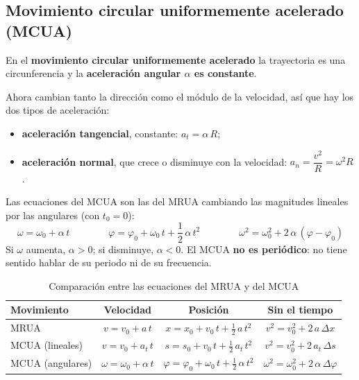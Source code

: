 \subsection{Movimiento circular uniformemente acelerado (MCUA)}

\begin{definition}[MCUA]
    En el \textbf{movimiento circular uniformemente acelerado} la trayectoria es una circunferencia y la \textbf{aceleración angular
    \(\alpha\) es constante}.
\end{definition}

Ahora cambian tanto la dirección como el módulo de la velocidad, así que hay los dos tipos de aceleración:
\begin{itemize}
    \item \textbf{aceleración tangencial}, constante: \(a_t = \alpha\,R\);
    \item \textbf{aceleración normal}, que crece o disminuye con la velocidad: \(a_n = \dfrac{v^2}{R} = \omega^2 R\).
\end{itemize}
Las ecuaciones del MCUA son las del MRUA cambiando las magnitudes lineales por las angulares (con \(t_0 = 0\)):
\[ \boxed{\omega = \omega_0 + \alpha\,t} \qquad\qquad \boxed{\varphi = \varphi_0 + \omega_0\,t + \frac{1}{2}\,\alpha\,t^2}
   \qquad\qquad \omega^2 = \omega_0^2 + 2\,\alpha\,(\varphi - \varphi_0) \]
Si \(\omega\) aumenta, \(\alpha > 0\); si disminuye, \(\alpha < 0\). El MCUA \textbf{no es periódico}: no tiene sentido hablar de su
periodo ni de su frecuencia.

\begin{table}[H]
    \centering
    \caption{Comparación entre las ecuaciones del MRUA y del MCUA}
    \vspace{-5pt}
    \begin{tabular}{@{}lccc@{}}
        \toprule
        \textbf{Movimiento} & \textbf{Velocidad} & \textbf{Posición} & \textbf{Sin el tiempo} \\
        \midrule
        MRUA & \(v = v_0 + a\,t\) & \(x = x_0 + v_0\,t + \frac{1}{2}\,a\,t^2\) & \(v^2 = v_0^2 + 2\,a\,\Delta x\) \\[3pt]
        MCUA (lineales) & \(v = v_0 + a_t\,t\) & \(s = s_0 + v_0\,t + \frac{1}{2}\,a_t\,t^2\) & \(v^2 = v_0^2 + 2\,a_t\,\Delta s\) \\[3pt]
        MCUA (angulares) & \(\omega = \omega_0 + \alpha\,t\) & \(\varphi = \varphi_0 + \omega_0\,t + \frac{1}{2}\,\alpha\,t^2\) & \(\omega^2 = \omega_0^2 + 2\,\alpha\,\Delta\varphi\) \\
        \bottomrule
    \end{tabular}
    \label{tab:ud9-mcua}
\end{table}

